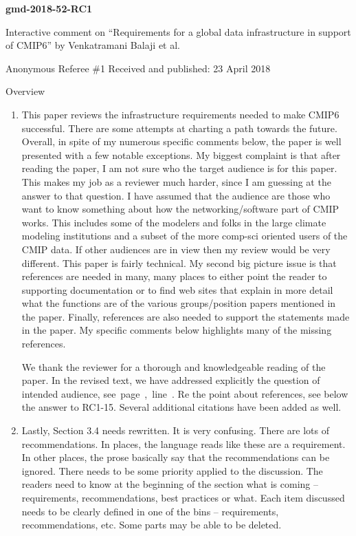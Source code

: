 \documentclass[gmd,manuscript]{copernicus}
\newcommand{\plref}[1]{\mbox{see page \pageref{p-#1}, line
    \lineref{l-#1}.}}
\newenvironment{answer}{\color{blue}}{}
\begin{document}
\pagebreak


\textbf{gmd-2018-52-RC1}

Interactive comment on “Requirements for a global data infrastructure
in support of CMIP6” by Venkatramani Balaji et al.

Anonymous Referee \#1
Received and published: 23 April 2018

Overview

\begin{enumerate}[label=RC1-Overview-\arabic*,leftmargin=*]
\item This paper reviews the infrastructure requirements needed to
  make CMIP6 successful. There are some attempts at charting a path
  towards the future. Overall, in spite of my numerous specific
  comments below, the paper is well presented with a few notable
  exceptions. My biggest complaint is that after reading the paper, I
  am not sure who the target audience is for this paper. This makes my
  job as a reviewer much harder, since I am guessing at the answer to
  that question. I have assumed that the audience are those who want
  to know something about how the networking/software part of CMIP
  works. This includes some of the modelers and folks in the large
  climate modeling institutions and a subset of the more comp-sci
  oriented users of the CMIP data. If other audiences are in view then
  my review would be very different. This paper is fairly technical.
  My second big picture issue is that references are needed in many,
  many places to either point the reader to supporting documentation
  or to find web sites that explain in more detail what the functions
  are of the various groups/position papers mentioned in the paper.
  Finally, references are also needed to support the statements made
  in the paper. My specific comments below highlights many of the
  missing references.

  \begin{answer}
    We thank the reviewer for a thorough and knowledgeable reading of
    the paper. In the revised text, we have addressed explicitly the
    question of intended audience, \plref{RC1-Overview-1} Re the point
    about references, see below the answer to RC1-15. Several
    additional citations have been added as well.
  \end{answer}
\item Lastly, Section 3.4 needs rewritten. It is very confusing. There
  are lots of recommendations. In places, the language reads like
  these are a requirement. In other places, the prose basically say
  that the recommendations can be ignored. There needs to be some
  priority applied to the discussion. The readers need to know at the
  beginning of the section what is coming -- requirements,
  recommendations, best practices or what. Each item discussed needs
  to be clearly defined in one of the bins -- requirements,
  recommendations, etc. Some parts may be able to be deleted.


\end{enumerate}
\end{document}
